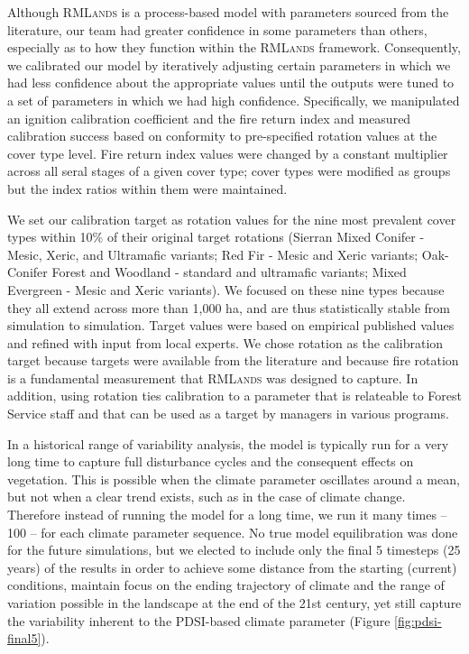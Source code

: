 Although \textsc{RMLands} is a process-based model with parameters sourced from the literature, our team had greater confidence in some parameters than others, especially as to how they function within the \textsc{RMLands} framework. Consequently, we calibrated our model by iteratively adjusting certain parameters in which we had less confidence about the appropriate values until the outputs were tuned to a set of parameters in which we had high confidence. Specifically, we manipulated an ignition calibration coefficient and the fire return index and measured calibration success based on conformity to pre-specified rotation values at the cover type level. Fire return index values were changed by a constant multiplier across all seral stages of a given cover type; cover types were modified as groups but the index ratios within them were maintained. 

We set our calibration target as rotation values for the nine most prevalent cover types within 10\% of their original target rotations (Sierran Mixed Conifer - Mesic, Xeric, and Ultramafic variants; Red Fir - Mesic and Xeric variants; Oak-Conifer Forest and Woodland - standard and ultramafic variants; Mixed Evergreen - Mesic and Xeric variants). We focused on these nine types because they all extend across more than 1,000 ha, and are thus statistically stable from simulation to simulation. Target values were based on empirical published values and refined with input from local experts. We chose rotation as the calibration target because targets were available from the literature and because fire rotation is a fundamental measurement that \textsc{RMLands} was designed to capture. In addition, using rotation ties calibration to a parameter that is relateable to Forest Service staff and that can be used as a target by managers in various programs. 

In a historical range of variability analysis, the model is typically run for a very long time to capture full disturbance cycles and the consequent effects on vegetation. This is possible when the climate parameter oscillates around a mean, but not when a clear trend exists, such as in the case of climate change. Therefore instead of running the model for a long time, we run it many times -- 100 -- for each climate parameter sequence. No true model equilibration was done for the future simulations, but we elected to include only the final 5 timesteps (25 years) of the results in order to achieve some distance from the starting (current) conditions, maintain focus on the ending trajectory of climate and the range of variation possible in the landscape at the end of the 21st century, yet still capture the variability inherent to the PDSI-based climate parameter (Figure \ref{fig:pdsi-final5}).



